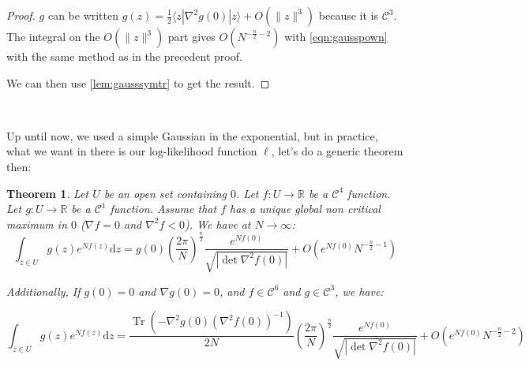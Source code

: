 \documentclass[10pt,a4paper]{report}
\theoremstyle{plain}
\newtheorem{thm}{Theorem}[chapter]
\theoremstyle{definition}
\theoremstyle{remark}
\newcommand{\R}{\ensuremath{\mathbb{R}}}
\newcommand{\ket}[1]{|#1\rangle}
\newcommand{\bra}[1]{\langle#1|}
\newcommand{\dd}{\mathrm{d}}
\DeclareMathOperator{\Tr}{Tr}
\newcommand{\class}[1]{{\mathscr{C}^{#1}}}
\begin{document}
\begin{proof}
  $g$ can be written $g(z) = \frac12\bra z \nabla^2 g(0) \ket z + O(\|z\|^3)$ because it
  is $\class 3$. The integral on the $O(\|z\|^3)$ part gives $O\left({N^{-\frac
        n 2 -2}}\right)$ with \cref{eqn:gausspown} with the same method as in
  the precedent proof.

  We can then use \cref{lem:gausssymtr} to get the result.
\end{proof}

\

Up until now, we used a simple Gaussian in the exponential, but in practice,
what we want in there is our log-likelihood function $\ell$, let's do a generic
theorem then:

\begin{thm}\label{thm:asymid}
  Let $U$ be an open set containing $0$. Let $f : U \to \R$ be a $\class 4$ function.
  Let $g : U \to \R$ be a $\class 1$ function.
  Assume that $f$ has a unique global non critical maximum in $0$
  ($\nabla f = 0$ and $\nabla^2 f < 0$). We have at $N \to \infty$:
  \[\int_{z \in U} g(z)e^{Nf(z)} \dd z = g(0)
    {\left(\frac {2\pi}{N}\right)}^{\frac n 2}
    \frac {e^{Nf(0)}}{\sqrt{\left|\det \nabla^2 f(0)\right|}}
    + O(e^{Nf(0)} N^{-\frac n 2 -1})\]

  Additionally, If $g(0) = 0$ and $\nabla g(0) = 0$, and $f \in \class 6$ and $g
  \in \class 3$, we have:

  \[\int_{z \in U} g(z)e^{N f(z)} \dd z =
    \frac{\Tr\left(-\nabla^2 g(0) {\left(\nabla^2 f(0)\right)}^{-1}\right)}{2N}
    {\left(\frac {2\pi}{N}\right)}^{\frac n 2}
    \frac {e^{Nf(0)}}{\sqrt{\left|\det \nabla^2 f(0)\right|}}
    + O\left(e^{Nf(0)}{N^{-\frac n 2 -2}}\right)\]
\end{thm}
\end{document}
